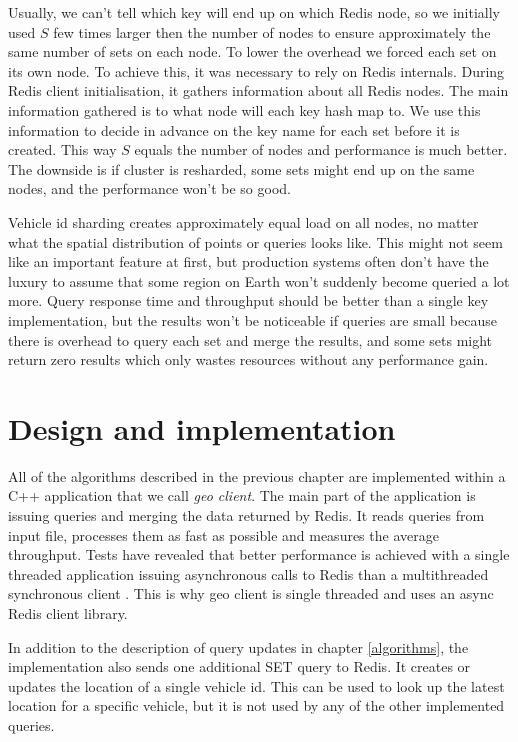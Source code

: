 \documentclass[times, utf8, diplomski]{fer}
\begin{document}
Usually, we can't tell which key will end up on which Redis node, so we initially used $S$ few times larger then the number of nodes to ensure approximately the same number of sets on each node. To lower the overhead we forced each set on its own node. To achieve this, it was necessary to rely on Redis internals. During Redis client initialisation, it gathers information about all Redis nodes. The main information gathered is to what node will each key hash map to. We use this information to decide in advance on the key name for each set before it is created. This way $S$ equals the number of nodes and performance is much better. The downside is if cluster is resharded, some sets  might end up on the same nodes, and the performance won't be so good.

Vehicle id sharding creates approximately equal load on all nodes, no matter what the spatial distribution of points or queries looks like. This might not seem like an important feature at first, but production systems often don't have the luxury to assume that some region on Earth won't suddenly become queried a lot more. Query response time and throughput should be better than a single key implementation, but the results won't be noticeable if queries are small because there is overhead to query each set and merge the results, and some sets might return zero results which only wastes resources without any performance gain.

\chapter {Design and implementation}
All of the algorithms described in the previous chapter are implemented within a C++ application that we call \emph{geo client}. The main part of the application is issuing queries and merging the data returned by Redis. It reads queries from input file, processes them as fast as possible and measures the average throughput. Tests have revealed that better performance is achieved with a single threaded application issuing asynchronous calls to Redis than a multithreaded synchronous client \cite{clientperf}. This is why geo client is single threaded and uses an async Redis client library.

In addition to the description of query updates in chapter \ref{algorithms}, the implementation also sends one additional SET query to Redis. It creates or updates the location of a single vehicle id. This can be used to look up the latest location for a specific vehicle, but it is not used by any of the other implemented queries.
\end{document}

